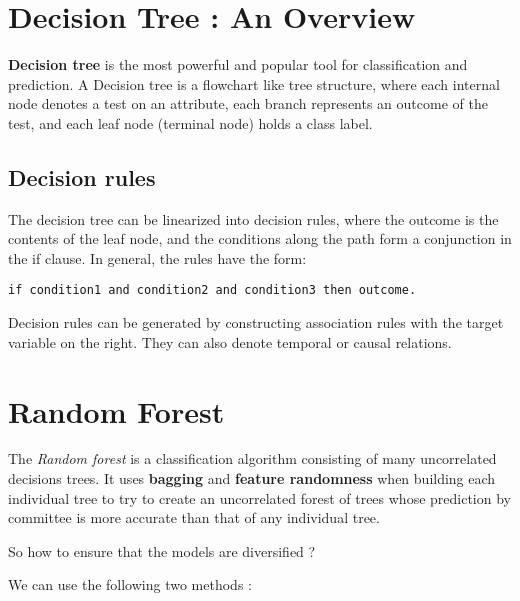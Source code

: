 \documentclass[11pt, a4paper]{book}
\begin{document}
    \hypertarget{decision-tree-an-overview}{%
\section{Decision Tree : An
Overview}\label{decision-tree-an-overview}}

\textbf{Decision tree} is the most powerful and popular tool for
classification and prediction. A Decision tree is a flowchart like tree
structure, where each internal node denotes a test on an attribute, each
branch represents an outcome of the test, and each leaf node (terminal
node) holds a class label.

\hypertarget{decision-rules}{%
\subsection{Decision rules}\label{decision-rules}}

The decision tree can be linearized into decision rules, where the
outcome is the contents of the leaf node, and the conditions along the
path form a conjunction in the if clause. In general, the rules have the
form:

\begin{verbatim}
if condition1 and condition2 and condition3 then outcome.
\end{verbatim}

Decision rules can be generated by constructing association rules with
the target variable on the right. They can also denote temporal or
causal relations.

    \hypertarget{random-forest}{%
\section{Random Forest}\label{random-forest}}

The \emph{Random forest} is a classification algorithm consisting of
many uncorrelated decisions trees. It uses \textbf{bagging} and
\textbf{feature randomness} when building each individual tree to try to
create an uncorrelated forest of trees whose prediction by committee is
more accurate than that of any individual tree.

So how to ensure that the models are diversified ?

We can use the following two methods :
\end{document}
